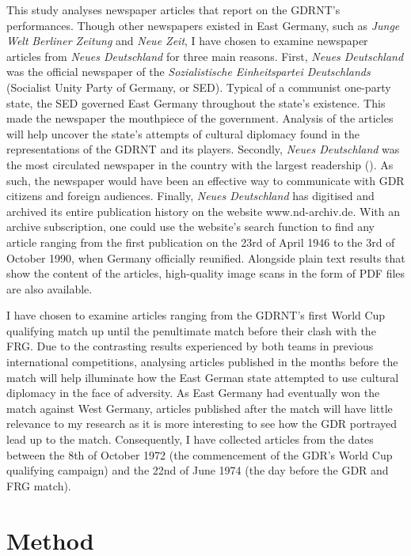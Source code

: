 This study analyses newspaper articles that report on the GDRNT’s performances. Though other newspapers existed in East Germany, such as \textit{Junge Welt} \textit{Berliner Zeitung} and \textit{Neue Zeit}, I have chosen to examine newspaper articles from \textit{Neues Deutschland} for three main reasons. First, \textit{Neues Deutschland} was the official newspaper of the \textit{Sozialistische Einheitspartei Deutschlands} (Socialist Unity Party of Germany, or SED). Typical of a communist one-party state, the SED governed East Germany throughout the state’s existence. This made the newspaper the mouthpiece of the government. Analysis of the articles will help uncover the state’s attempts of cultural diplomacy found in the representations of the GDRNT and its players. Secondly, \textit{Neues Deutschland} was the most circulated newspaper in the country with the largest readership (\cite{meyenschweiger2008}). As such, the newspaper would have been an effective way to communicate with GDR citizens and foreign audiences. Finally, \textit{Neues Deutschland} has digitised and archived its entire publication history on the website www.nd-archiv.de. With an archive subscription, one could use the website's search function to find any article ranging from the first publication on the 23rd of April 1946 to the 3rd of October 1990, when Germany officially reunified. Alongside plain text results that show the content of the articles, high-quality image scans in the form of PDF files are also available.

I have chosen to examine articles ranging from the GDRNT’s first World Cup qualifying match up until the penultimate match before their clash with the FRG. Due to the contrasting results experienced by both teams in previous international competitions, analysing articles published in the months before the match will help illuminate how the East German state attempted to use cultural diplomacy in the face of adversity. As East Germany had eventually won the match against West Germany, articles published after the match will have little relevance to my research as it is more interesting to see how the GDR portrayed lead up to the match. Consequently, I have collected articles from the dates between the 8th of October 1972  (the commencement of the GDR’s World Cup qualifying campaign) and the 22nd of June 1974 (the day before the GDR and FRG match).

\section*{Method}

